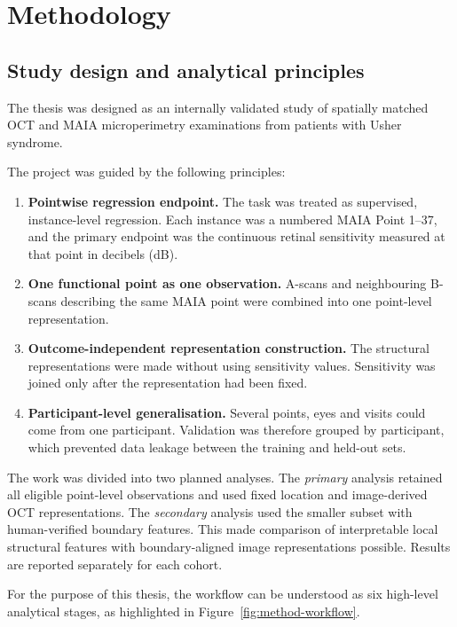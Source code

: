 \chapter{Methodology}
\label{chap:methods}

\section{Study design and analytical principles}
\label{sec:design}

The thesis was designed as an internally validated study of spatially matched OCT and MAIA microperimetry examinations from patients with Usher syndrome.

The project was guided by the following principles:

\begin{enumerate}
  \item \textbf{Pointwise regression endpoint.} The task was treated as supervised, instance-level regression. Each instance was a numbered MAIA Point 1--37, and the primary endpoint was the continuous retinal sensitivity measured at that point in decibels (dB).
  \item \textbf{One functional point as one observation.} A-scans and neighbouring B-scans describing the same MAIA point were combined into one point-level representation.
  \item \textbf{Outcome-independent representation construction.} The structural representations were made without using sensitivity values. Sensitivity was joined only after the representation had been fixed.
  \item \textbf{Participant-level generalisation.} Several points, eyes and visits could come from one participant. Validation was therefore grouped by participant, which prevented data leakage between the training and held-out sets.
\end{enumerate}

The work was divided into two planned analyses. The \emph{primary} analysis retained all eligible point-level observations and used fixed location and image-derived OCT representations. The \emph{secondary} analysis used the smaller subset with human-verified boundary features. This made comparison of interpretable local structural features with boundary-aligned image representations possible. Results are reported separately for each cohort.

For the purpose of this thesis, the workflow can be understood as six high-level analytical stages, as highlighted in Figure~\ref{fig:method-workflow}.

